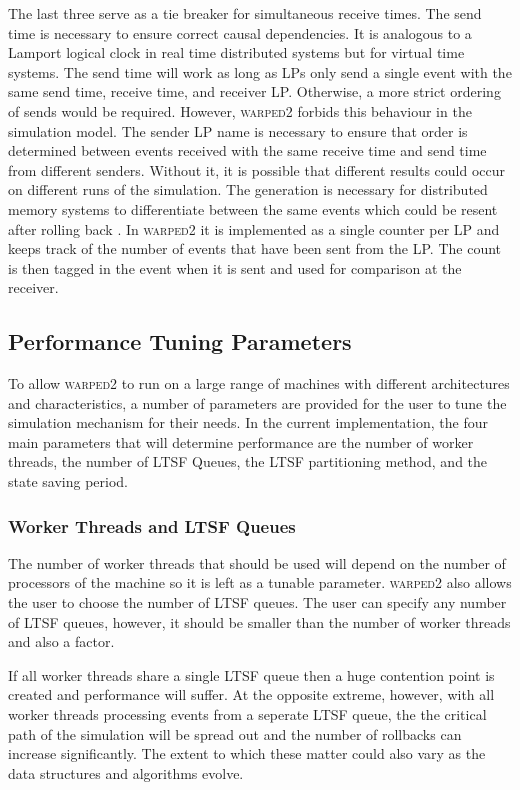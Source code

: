 \documentclass[11pt]{book}
\begin{document}
\noindent %
The last three serve as a tie breaker for simultaneous receive times. The send time is
necessary to ensure correct causal dependencies. It is analogous to a Lamport logical
clock\cite{lamport-78} in real time distributed systems but for virtual time systems. The
send time will work as long as LPs only send a single event with the same send time, receive
time, and receiver LP. Otherwise, a more strict ordering of sends would be required. However,
\textsc{warped2} forbids this behaviour in the simulation model. The sender LP name is necessary
to ensure that order is determined between events received with the same receive time and send
time from different senders. Without it, it is possible that different results could occur on
different runs of the simulation\cite{ronngren-99}. The generation is necessary for distributed
memory systems to differentiate between the same events which could be resent after rolling back
\cite{ronngren-99}. In \textsc{warped2} it is implemented as a single counter per LP and
keeps track of the number of events that have been sent from the LP. The count is then
tagged in the event when it is sent and used for comparison at the receiver.

\subsection{Performance Tuning Parameters}

To allow \textsc{warped2} to run on a large range of machines with different architectures and
characteristics, a number of parameters are provided for the user to tune the simulation mechanism
for their needs. In the current implementation, the four main parameters that will determine
performance are the number of worker threads, the number of LTSF Queues, the LTSF partitioning
method, and the state saving period.

\subsubsection{Worker Threads and LTSF Queues}

The number of worker threads that should be used will depend on the number of processors of the
machine so it is left as a tunable parameter. \textsc{warped2} also allows the user to choose
the number of LTSF queues. The user can specify any number of LTSF queues, however, it should
be smaller than the number of worker threads and also a factor. 

If all worker threads share a single LTSF queue then a huge contention point is created and
performance will suffer. At the opposite extreme, however, with all worker threads processing
events from a seperate LTSF queue, the the critical path of the simulation will be spread out
and the number of rollbacks can increase significantly. The extent to which these matter could
also vary as the data structures and algorithms evolve.
\end{document}

